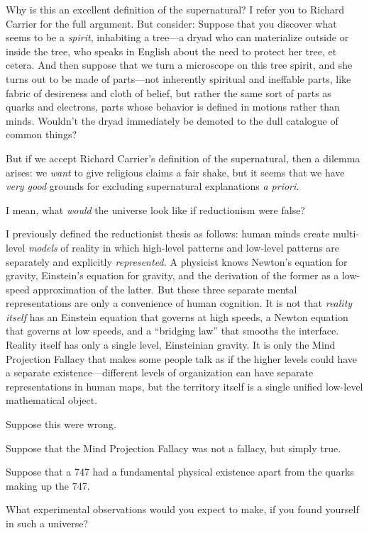 {
 Why is this an excellent definition of the supernatural? I refer
you to Richard Carrier for the full argument. But consider: Suppose
that you discover what seems to be a \textit{spirit}, inhabiting a
tree---a dryad who can materialize outside or inside the tree, who
speaks in English about the need to protect her tree, et cetera. And
then suppose that we turn a microscope on this tree spirit, and she
turns out to be made of parts---not inherently spiritual and ineffable
parts, like fabric of desireness and cloth of belief, but rather the
same sort of parts as quarks and electrons, parts whose behavior is
defined in motions rather than minds. Wouldn't the
dryad immediately be demoted to the dull catalogue of common things?}

{
 But if we accept Richard Carrier's definition of
the supernatural, then a dilemma arises: we \textit{want} to give
religious claims a fair shake, but it seems that we have \textit{very
good} grounds for excluding supernatural explanations \textit{a
priori.}}

{
 I mean, what \textit{would} the universe look like if reductionism
were false?}

{
 I previously defined the reductionist thesis as follows: human
minds create multi-level \textit{models} of reality in which high-level
patterns and low-level patterns are separately and explicitly
\textit{represented.} A physicist knows Newton's
equation for gravity, Einstein's equation for gravity,
and the derivation of the former as a low-speed approximation of the
latter. But these three separate mental representations are only a
convenience of human cognition. It is not that \textit{reality itself}
has an Einstein equation that governs at high speeds, a Newton equation
that governs at low speeds, and a ``bridging
law'' that smooths the interface. Reality itself has
only a single level, Einsteinian gravity. It is only the Mind
Projection Fallacy that makes some people talk as if the higher levels
could have a separate existence---different levels of organization can
have separate representations in human maps, but the territory itself
is a single unified low-level mathematical object.}

{
 Suppose this were wrong.}

{
 Suppose that the Mind Projection Fallacy was not a fallacy, but
simply true.}

{
 Suppose that a 747 had a fundamental physical existence apart from
the quarks making up the 747.}

{
 What experimental observations would you expect to make, if you
found yourself in such a universe?}

